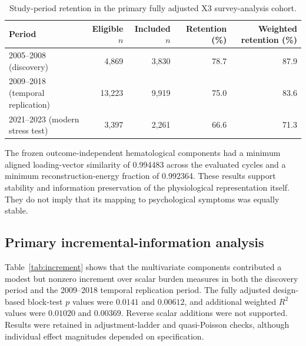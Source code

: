 \documentclass[11pt,a4paper]{article}
\newcommand{\Rtwo}{R^{2}}
\begin{document}
\begin{table}[htbp]\centering\small
\caption{Study-period retention in the primary fully adjusted X3 survey-analysis cohort.}
\label{tab:cohort}
\setlength{\tabcolsep}{4pt}
\begin{tabular}{lrrrr}\toprule
Period & Eligible $n$ & Included $n$ & Retention (\%) & Weighted retention (\%) \\\midrule
2005--2008 (discovery) & 4,869 & 3,830 & 78.7 & 87.9\\
2009--2018 (temporal replication) & 13,223 & 9,919 & 75.0 & 83.6\\
2021--2023 (modern stress test) & 3,397 & 2,261 & 66.6 & 71.3\\\bottomrule
\end{tabular}
\end{table}

The frozen outcome-independent hematological components had a minimum aligned loading-vector similarity of 0.994483 across the evaluated cycles and a minimum reconstruction-energy fraction of 0.992364. These results support stability and information preservation of the physiological representation itself. They do not imply that its mapping to psychological symptoms was equally stable.

\subsection{Primary incremental-information analysis}
Table~\ref{tab:increment} shows that the multivariate components contributed a modest but nonzero increment over scalar burden measures in both the discovery period and the 2009--2018 temporal replication period. The fully adjusted design-based block-test $p$ values were $0.0141$ and $0.00612$, and additional weighted $\Rtwo$ values were $0.01020$ and $0.00369$. Reverse scalar additions were not supported. Results were retained in adjustment-ladder and quasi-Poisson checks, although individual effect magnitudes depended on specification.
\end{document}
